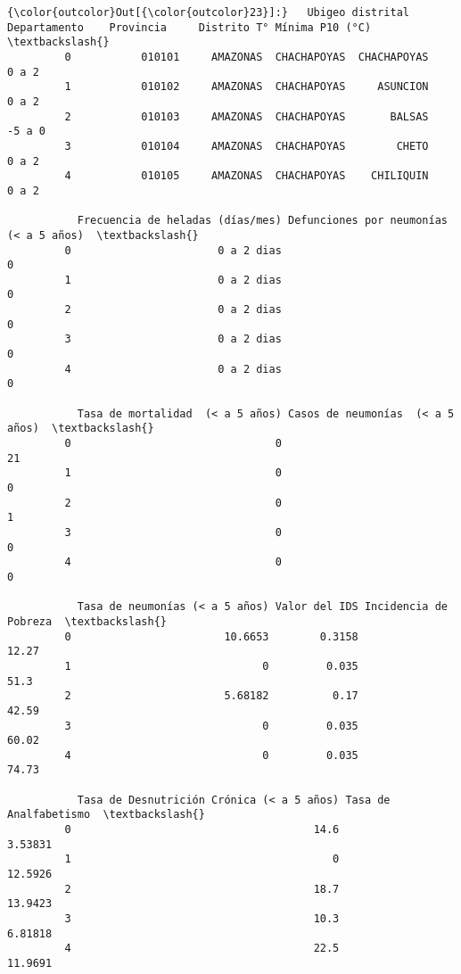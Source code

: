 \documentclass[11pt]{article}
\begin{document}
\begin{Verbatim}[commandchars=\\\{\}]
{\color{outcolor}Out[{\color{outcolor}23}]:}   Ubigeo distrital Departamento    Provincia     Distrito T° Mínima P10 (°C)  \textbackslash{}
         0           010101     AMAZONAS  CHACHAPOYAS  CHACHAPOYAS              0 a 2   
         1           010102     AMAZONAS  CHACHAPOYAS     ASUNCION              0 a 2   
         2           010103     AMAZONAS  CHACHAPOYAS       BALSAS             -5 a 0   
         3           010104     AMAZONAS  CHACHAPOYAS        CHETO              0 a 2   
         4           010105     AMAZONAS  CHACHAPOYAS    CHILIQUIN              0 a 2   
         
           Frecuencia de heladas (días/mes) Defunciones por neumonías (< a 5 años)  \textbackslash{}
         0                       0 a 2 dias                                      0   
         1                       0 a 2 dias                                      0   
         2                       0 a 2 dias                                      0   
         3                       0 a 2 dias                                      0   
         4                       0 a 2 dias                                      0   
         
           Tasa de mortalidad  (< a 5 años) Casos de neumonías  (< a 5 años)  \textbackslash{}
         0                                0                               21   
         1                                0                                0   
         2                                0                                1   
         3                                0                                0   
         4                                0                                0   
         
           Tasa de neumonías (< a 5 años) Valor del IDS Incidencia de Pobreza  \textbackslash{}
         0                        10.6653        0.3158                 12.27   
         1                              0         0.035                  51.3   
         2                        5.68182          0.17                 42.59   
         3                              0         0.035                 60.02   
         4                              0         0.035                 74.73   
         
           Tasa de Desnutrición Crónica (< a 5 años) Tasa de Analfabetismo  \textbackslash{}
         0                                      14.6               3.53831   
         1                                         0               12.5926   
         2                                      18.7               13.9423   
         3                                      10.3               6.81818   
         4                                      22.5               11.9691   
         

\end{Verbatim}
\end{document}
